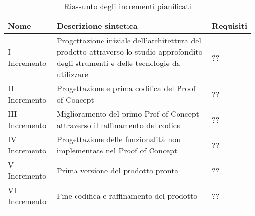 \begin{center}
	\begin{longtable}{|p{2.5cm}|p{6.5cm}|p{6cm}|}
	\hline
	\rowcolor{lighter-grayer}
	\textbf{Nome} & \textbf{Descrizione sintetica} & \textbf{Requisiti} \\
	\hline
	\endfirsthead
	\hline
    \hline
    \endfoot
    \endlastfoot
	\hline
	I Incremento & Progettazione iniziale dell'architettura del prodotto attraverso lo studio approfondito degli strumenti e delle tecnologie da utilizzare & ?? \\
	II Incremento & Progettazione e prima codifica del Proof of Concept & ?? \\
	III Incremento & Miglioramento del primo Prof of Concept attraverso il raffinamento del codice & ?? \\
	IV Incremento & Progettazione delle funzionalità non implementate nel Proof of Concept & ?? \\
	V Incremento & Prima versione del prodotto pronta & ?? \\
	VI Incremento & Fine codifica e raffinamento del prodotto & ?? \\ \hline 
	\rowcolor{white}
	\caption{Riassunto degli incrementi pianificati}
	\end{longtable}
\end{center}